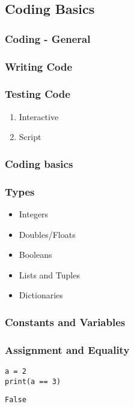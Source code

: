 \documentclass{article}
\begin{document}
\subsection{Coding Basics}
\label{sec:orgdc1e6cd}
\subsubsection{Coding - General}
\label{sec:orgce59498}
\subsubsection{Writing Code}
\label{sec:org9ef234f}
\subsubsection{Testing Code}
\label{sec:org86cea51}
\begin{enumerate}
\item Interactive
\label{sec:org220085e}
\item Script
\label{sec:orga233ad6}
\end{enumerate}
\subsubsection{Coding basics}
\label{sec:org507779c}
\subsubsection{Types}
\label{sec:orge406378}
\begin{itemize}
\item Integers
\item Doubles/Floats
\item Booleans
\item Lists and Tuples
\item Dictionaries
\end{itemize}
\subsubsection{Constants and Variables}
\label{sec:orgae493da}
\subsubsection{Assignment and Equality}
\label{sec:org6646e58}
\begin{verbatim}
a = 2
print(a == 3)
\end{verbatim}

\begin{verbatim}
False
\end{verbatim}
\end{document}

